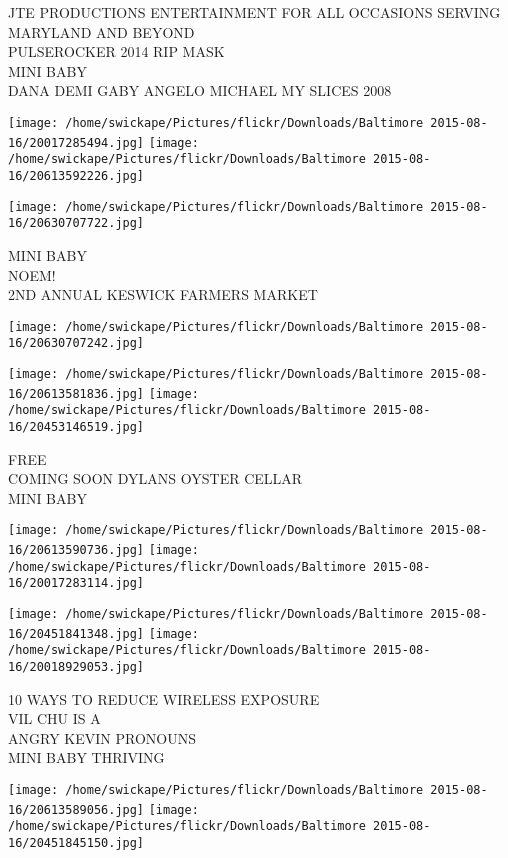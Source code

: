 \documentclass[10pt,letterpaper]{article}
\begin{document}
JTE PRODUCTIONS ENTERTAINMENT FOR ALL OCCASIONS SERVING MARYLAND AND BEYOND\\
PULSEROCKER 2014 RIP MASK\\
MINI BABY\\
DANA DEMI GABY ANGELO MICHAEL MY SLICES 2008\\
\pagebreak

\texttt{[image: /home/swickape/Pictures/flickr/Downloads/Baltimore 2015-08-16/20017285494.jpg]}
\texttt{[image: /home/swickape/Pictures/flickr/Downloads/Baltimore 2015-08-16/20613592226.jpg]}

\texttt{[image: /home/swickape/Pictures/flickr/Downloads/Baltimore 2015-08-16/20630707722.jpg]}

MINI BABY\\
NOEM!\\
2ND ANNUAL KESWICK FARMERS MARKET\\
\pagebreak

\texttt{[image: /home/swickape/Pictures/flickr/Downloads/Baltimore 2015-08-16/20630707242.jpg]}

\vspace{0.25in}
\texttt{[image: /home/swickape/Pictures/flickr/Downloads/Baltimore 2015-08-16/20613581836.jpg]}
\texttt{[image: /home/swickape/Pictures/flickr/Downloads/Baltimore 2015-08-16/20453146519.jpg]}

FREE\\
COMING SOON DYLANS OYSTER CELLAR\\
MINI BABY\\
\pagebreak

\texttt{[image: /home/swickape/Pictures/flickr/Downloads/Baltimore 2015-08-16/20613590736.jpg]}
\texttt{[image: /home/swickape/Pictures/flickr/Downloads/Baltimore 2015-08-16/20017283114.jpg]}

\texttt{[image: /home/swickape/Pictures/flickr/Downloads/Baltimore 2015-08-16/20451841348.jpg]}
\texttt{[image: /home/swickape/Pictures/flickr/Downloads/Baltimore 2015-08-16/20018929053.jpg]}

10 WAYS TO REDUCE WIRELESS EXPOSURE\\
VIL CHU IS A\\
ANGRY KEVIN PRONOUNS\\
MINI BABY THRIVING\\
\pagebreak

\texttt{[image: /home/swickape/Pictures/flickr/Downloads/Baltimore 2015-08-16/20613589056.jpg]}
\texttt{[image: /home/swickape/Pictures/flickr/Downloads/Baltimore 2015-08-16/20451845150.jpg]}
\end{document}
